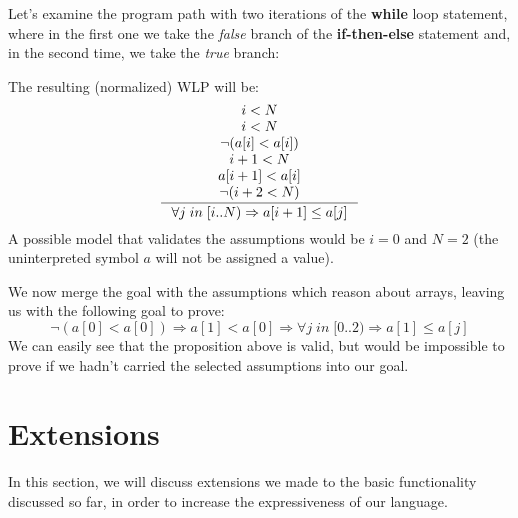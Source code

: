 \documentclass[nonatbib,numbers,10pt]{sigplanconf}
\begin{document}
Let's examine the program path with two iterations of the \textbf{while} loop statement, where in the first one we take the \textit{false} branch of the \textbf{if-then-else} statement and, in the second time, we take the \textit{true} branch:


The resulting (normalized) WLP will be:
\[
\inference {
	i < N \\ 
	i < N \\
	\neg (a[i] < a[i]) \\
	i + 1 < N \\
	a[i+1] < a[i] \\
	\neg (i + 2 < N)	
}{\forall j \; in \; [i..N) \Rightarrow a[i+1] \le a[j]}
\]
A possible model that validates the assumptions would be $i = 0$ and $N = 2$ (the uninterpreted symbol $a$ will not be assigned a value).

We now merge the goal with the assumptions which reason about arrays, leaving us with the following goal to prove:
\begin{equation*}
\neg (a[0] < a[0]) \Rightarrow a[1] < a[0] \Rightarrow \forall j \; in \; [0..2) \Rightarrow a[1] \le a[j]
\end{equation*}
We can easily see that the proposition above is valid, but would be impossible to prove if we hadn't carried the selected assumptions into our goal.

\section{Extensions}
In this section, we will discuss extensions we made to the basic functionality discussed so far, in order to increase the expressiveness of our language.
\end{document}

